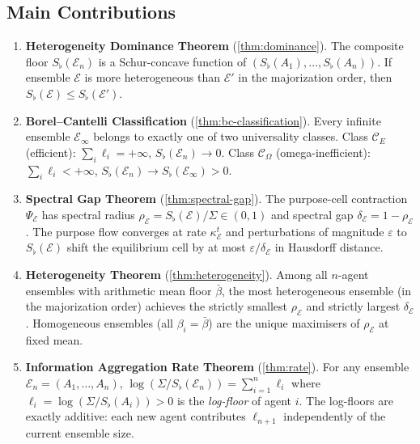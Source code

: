 \documentclass[twocolumn,11pt,a4paper]{article}
\theoremstyle{remark}
\newcommand{\Sflat}{S_{\flat}}
\newcommand{\Ens}{\mathcal{E}}
\newcommand{\srad}{\rho}                  %
\newcommand{\sgap}{\delta}                %
\newcommand{\ClassE}{\mathcal{C}_E}       %
\newcommand{\ClassO}{\mathcal{C}_\Omega}  %
\newcommand{\logfl}{\ell}                 %
\begin{document}
\subsection{Main Contributions}
\label{sec:intro:contrib}

\begin{enumerate}[leftmargin=*, label=\textbf{(\roman*)}]
\item \textbf{Heterogeneity Dominance Theorem}
  (\cref{thm:dominance}).
  The composite floor $\Sflat(\Ens_n)$ is a Schur-concave function of
  $(\Sflat(A_1),\ldots,\Sflat(A_n))$.  If ensemble $\Ens$ is more
  heterogeneous than $\Ens'$ in the majorization order, then
  $\Sflat(\Ens) \le \Sflat(\Ens')$.

\item \textbf{Borel--Cantelli Classification}
  (\cref{thm:bc-classification}).
  Every infinite ensemble $\Ens_\infty$ belongs to exactly one of two
  universality classes.  Class $\ClassE$ (efficient): $\sum_i \logfl_i =
  +\infty$, $\Sflat(\Ens_n) \to 0$.  Class $\ClassO$ (omega-inefficient):
  $\sum_i \logfl_i < +\infty$, $\Sflat(\Ens_n) \to \Sflat(\Ens_\infty)>0$.

\item \textbf{Spectral Gap Theorem}
  (\cref{thm:spectral-gap}).
  The purpose-cell contraction $\Psi_\Ens$ has spectral radius
  $\srad_\Ens = \Sflat(\Ens)/\Sigma \in (0,1)$ and spectral gap
  $\sgap_\Ens = 1 - \srad_\Ens$.  The purpose flow converges at rate
  $\kappa_\Ens^t$ and perturbations of magnitude $\varepsilon$ to
  $\Sflat(\Ens)$ shift the equilibrium cell by at most
  $\varepsilon/\sgap_\Ens$ in Hausdorff distance.

\item \textbf{Heterogeneity Theorem}
  (\cref{thm:heterogeneity}).
  Among all $n$-agent ensembles with arithmetic mean floor $\bar\beta$,
  the most heterogeneous ensemble (in the majorization order) achieves the
  strictly smallest $\srad_\Ens$ and strictly largest $\sgap_\Ens$.
  Homogeneous ensembles (all $\beta_i = \bar\beta$) are the unique maximisers
  of $\srad_\Ens$ at fixed mean.

\item \textbf{Information Aggregation Rate Theorem}
  (\cref{thm:rate}).
  For any ensemble $\Ens_n = (A_1,\ldots,A_n)$,
  $\log(\Sigma/\Sflat(\Ens_n)) = \sum_{i=1}^n \logfl_i$ where
  $\logfl_i = \log(\Sigma/\Sflat(A_i)) > 0$ is the \emph{log-floor} of
  agent $i$.  The log-floors are exactly additive: each new agent
  contributes $\logfl_{n+1}$ independently of the current ensemble size.


\end{enumerate}
\end{document}
